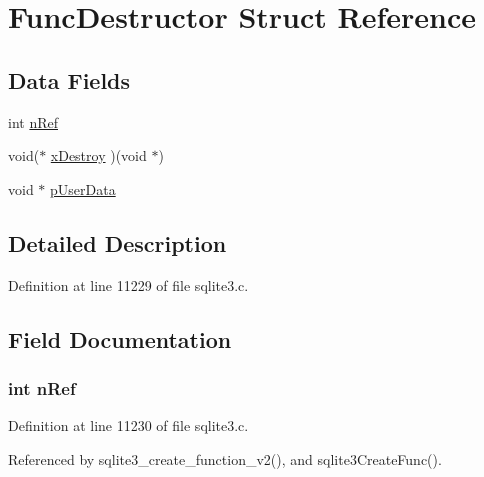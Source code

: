 \hypertarget{struct_func_destructor}{}\section{Func\+Destructor Struct Reference}
\label{struct_func_destructor}
\subsection*{Data Fields}
\begin{DoxyCompactItemize}
\item 
int \hyperlink{struct_func_destructor_a3c459f9ae278c22b72583c55ca01acb7}{n\+Ref}
\item 
void($\ast$ \hyperlink{struct_func_destructor_aa4fca9e7c2c7eaf8fc25b50e9a7c1329}{x\+Destroy} )(void $\ast$)
\item 
void $\ast$ \hyperlink{struct_func_destructor_a8d75dbe9027a94780bc2f31670400613}{p\+User\+Data}
\end{DoxyCompactItemize}


\subsection{Detailed Description}


Definition at line 11229 of file sqlite3.\+c.



\subsection{Field Documentation}
\hypertarget{struct_func_destructor_a3c459f9ae278c22b72583c55ca01acb7}{}
\subsubsection[{n\+Ref}]{\setlength{\rightskip}{0pt plus 5cm}int n\+Ref}\label{struct_func_destructor_a3c459f9ae278c22b72583c55ca01acb7}


Definition at line 11230 of file sqlite3.\+c.



Referenced by sqlite3\+\_\+create\+\_\+function\+\_\+v2(), and sqlite3\+Create\+Func().

\hypertarget{struct_func_destructor_a8d75dbe9027a94780bc2f31670400613}{}
